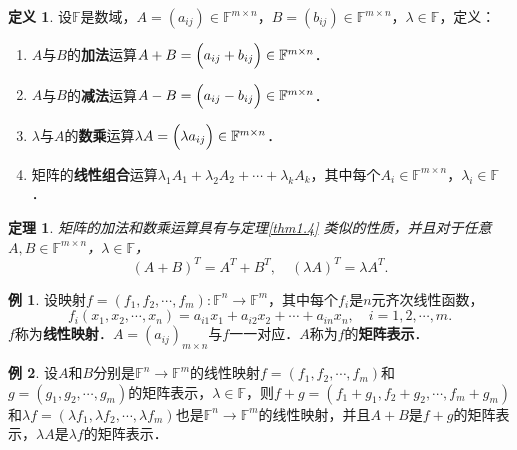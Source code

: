 \documentclass[a4paper,fontset=windows]{ctexbook}
\newtheorem{theorem}{定理}[chapter]
\theoremstyle{definition}
\newtheorem{definition}{定义}[chapter]
\newtheorem{example}{例}[chapter]
\begin{document}
\begin{definition}
设$\mathbb{F}$是数域，$A=(a_{ij})\in\mathbb{F}^{m\times n}$，$B=(b_{ij})\in\mathbb{F}^{m\times n}$，$\lambda\in\mathbb{F}$，定义：
\begin{enumerate}
\item $A$与$B$的{\bf 加法}运算$A+B=\Bigl(a_{ij}+b_{ij}\Bigr)\in\mathbb{F}^{m\times n}$．
\item $A$与$B$的{\bf 减法}运算$A-B=\Bigl(a_{ij}-b_{ij}\Bigr)\in\mathbb{F}^{m\times n}$．
\item $\lambda$与$A$的{\bf 数乘}运算$\lambda A=\Bigl(\lambda a_{ij}\Bigr)\in\mathbb{F}^{m\times n}$．
\item 矩阵的{\bf 线性组合}运算$\lambda_1A_1+\lambda_2A_2+\cdots+\lambda_kA_k$，其中每个$A_i\in\mathbb{F}^{m\times n}$，$\lambda_i\in\mathbb{F}$．
\end{enumerate}
\end{definition}

\begin{theorem}\label{thm2.1}
矩阵的加法和数乘运算具有与定理\ref{thm1.4} 类似的性质，并且对于任意$A,B\in\mathbb{F}^{m\times n}$，$\lambda\in\mathbb{F}$，
$$(A+B)^T=A^T+B^T,\quad (\lambda A)^T=\lambda A^T.$$
\end{theorem}

\begin{example}\label{ex2.1}
设映射$f=(f_1,f_2,\cdots,f_m):\mathbb{F}^n\to\mathbb{F}^m$，其中每个$f_i$是$n$元齐次线性函数，
$$f_i(x_1,x_2,\cdots,x_n)=a_{i1}x_1+a_{i2}x_2+\cdots+a_{in}x_n,\quad i=1,2,\cdots,m.$$
$f$称为{\bf 线性映射}．$A=(a_{ij})_{m\times n}$与$f$一一对应．$A$称为$f$的{\bf 矩阵表示}．
\end{example}

\begin{example}\label{ex2.2}
设$A$和$B$分别是$\mathbb{F}^n\to\mathbb{F}^m$的线性映射$f=(f_1,f_2,\cdots,f_m)$和$g=(g_1,g_2,\cdots,g_m)$的矩阵表示，$\lambda\in\mathbb{F}$，则$f+g=(f_1+g_1,f_2+g_2,\cdots,f_m+g_m)$和$\lambda f=(\lambda f_1,\lambda f_2,\cdots,\lambda f_m)$也是$\mathbb{F}^n\to\mathbb{F}^m$的线性映射，并且$A+B$是$f+g$的矩阵表示，$\lambda A$是$\lambda f$的矩阵表示．
\end{example}
\end{document}
